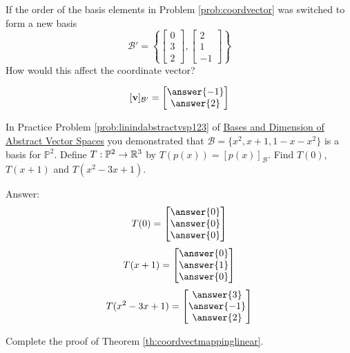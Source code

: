 \documentclass{ximera}
\begin{document}
\begin{problem}\label{prob:switchbasisorder}
If the order of the basis elements in Problem \ref{prob:coordvector} was switched to form a new basis
$$\mathcal{B}'=\left\{\begin{bmatrix}0\\3\\2\end{bmatrix}, \begin{bmatrix}2\\1\\-1\end{bmatrix} \right\}$$
How would this affect the coordinate vector?

$$[\vec{v}]_{\mathcal{B}'}=\begin{bmatrix}\answer{-1}\\\answer{2}\end{bmatrix}$$
\end{problem}



\begin{problem}\label{prob:polylintranscoordvect} In Practice Problem \ref{prob:linindabstractvsp123} of \href{https://ximera.osu.edu/oerlinalg/LinearAlgebra/VSP-0060/main}{Bases and Dimension of Abstract Vector Spaces} you demonstrated that
$\mathcal{B}=\{x^{2}, x + 1, 1 - x - x^{2}\}$ is a basis for $\mathbb{P}^2$.  Define $T:\mathbb{P}^2\rightarrow \mathbb{R}^3$ by $T(p(x))=[p(x)]_{\mathcal{B}}$.  Find $T(0)$, $T(x+1)$ and $T(x^2-3x+1)$.

Answer:
$$T(0)=\begin{bmatrix}\answer{0}\\\answer{0}\\\answer{0}\end{bmatrix}$$
$$T(x+1)=\begin{bmatrix}\answer{0}\\\answer{1}\\\answer{0}\end{bmatrix}$$
$$T(x^2-3x+1)=\begin{bmatrix}\answer{3}\\\answer{-1}\\\answer{2}\end{bmatrix}$$
\end{problem}

\begin{problem}\label{prob:completeproofoflin}
Complete the proof of Theorem \ref{th:coordvectmappinglinear}.
\end{problem}
\end{document}

